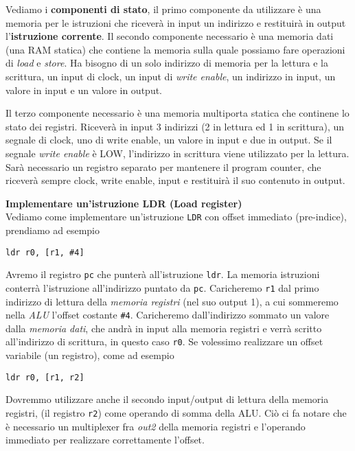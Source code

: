 Vediamo i \textbf{componenti di stato}, il primo componente da utilizzare è una
memoria per le istruzioni che riceverà in input un indirizzo e restituirà in
output l'\textbf{istruzione corrente}. Il secondo componente necessario è una
memoria dati (una RAM statica) che contiene la memoria sulla quale possiamo fare
operazioni di \textit{load} e \textit{store}. Ha bisogno di un solo indirizzo di
memoria per la lettura e la scrittura, un input di clock, un input di
\textit{write enable}, un indirizzo in input, un valore in input e un valore in
output.

Il terzo componente necessario è una memoria multiporta statica che continene lo
stato dei registri. Riceverà in input 3 indirizzi (2 in lettura ed 1 in
scrittura), un segnale di clock, uno di write enable, un valore in input e due
in output. Se il segnale \textit{write enable} è LOW, l'indirizzo in scrittura
viene utilizzato per la lettura. Sarà necessario un registro separato per
mantenere il program counter, che riceverà sempre clock, write enable, input e
restituirà il suo contenuto in output.


\begin{defn}
\textbf{Implementare un'istruzione LDR (Load register)} \\
Vediamo come implementare un'istruzione \texttt{LDR} con offset immediato
(pre-indice), prendiamo ad esempio
\begin{lstlisting}[style=arm]
ldr r0, [r1, #4]
\end{lstlisting}
Avremo il registro \texttt{pc} che punterà all'istruzione \texttt{ldr}. La
memoria istruzioni conterrà l'istruzione all'indirizzo puntato da \texttt{pc}.
Caricheremo \texttt{r1} dal primo indirizzo di lettura della \textit{memoria
registri} (nel suo output 1), a cui sommeremo  nella \textit{ALU} l'offset
costante \texttt{\#4}. Caricheremo dall'indirizzo sommato un valore dalla
\textit{memoria dati}, che andrà in input alla memoria registri e verrà scritto
all'indirizzo di scrittura, in questo caso \texttt{r0}.
Se volessimo realizzare un offset variabile (un registro), come ad esempio
\begin{lstlisting}[style=arm]
ldr r0, [r1, r2]
\end{lstlisting}
Dovremmo utilizzare anche il secondo input/output di lettura della memoria
registri, (il registro \texttt{r2}) come operando di somma della ALU. Ciò ci fa
notare che è necessario un multiplexer fra \textit{out2} della memoria registri
e l'operando immediato per realizzare correttamente l'offset.
\end{defn}


